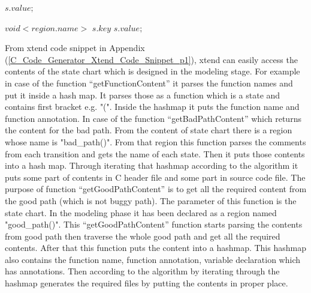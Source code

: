 \begin{algorithm}
\begin{algorithmic}[1]
						 
							\State $s.value;$
						\EndIf
					
					\EndFor 
			\EndIf
		
			 
			\State $void <region.name>$
				 
					  
						\State $s.key$						
					\EndIf
					\State $s.value;$
				\EndFor 
			\EndIf
				
		\EndFor
				
		\EndFunction
		
		
	\end{algorithmic}
	\noindent\makebox[\linewidth]{\rule{\textwidth}{0.4pt}}
\end{algorithm}

From xtend code snippet in Appendix (\ref{C_Code_Generator_Xtend_Code_Snippet_p1}), xtend can easily access the contents of the state chart which is designed in the modeling stage. For example in case of the function \enquote{getFunctionContent} it parses the function names and put it inside a hash map. It parses those as a function which is a state and contains first bracket e.g. "(". Inside the hashmap it puts the function name and function annotation. In case of the function \enquote{getBadPathContent} which returns the content for the bad path. From the content of state chart there is a region whose name is "bad\_path()". From that region this function parses the comments from each transition and gets the name of each state. Then it puts those contents into a hash map. Through iterating that hashmap according to the algorithm it puts some part of contents in C header file and some part in source code file. The purpose of function \enquote{getGoodPathContent} is to get all the required content from the good path (which is not buggy path). The parameter of this function is the state chart. In the modeling phase it has been declared as a region named "good\_path()". This \enquote{getGoodPathContent} function starts parsing the contents from good path then traverse the whole good path and get all the required contents. After that this function puts the content into a hashmap. This hashmap also contains the function name, function annotation, variable declaration which has annotations. Then according to the algorithm by iterating through the hashmap generates the required files by putting the contents in proper place. 

